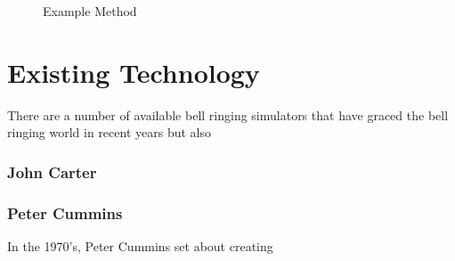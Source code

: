 \documentclass{l4proj}
\begin{document}
\begin{figure}
\centering     %
{}
\caption{Example Method}
\end{figure}

%
%
%
%
%
%
%
\section{Existing Technology}
There are a number of available bell ringing simulators that have graced the bell ringing world in recent years but also 

\subsubsection{John Carter}


\subsubsection{Peter Cummins}
In the 1970's, Peter Cummins set about creating 
\end{document}
